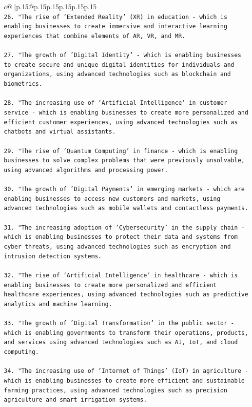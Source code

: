 \documentclass{article}
\begin{document}
{\begin{supertabular}{c@{$\;$}|p{.15\linewidth}@{}p{.15\linewidth}p{.15\linewidth}p{.15\linewidth}p{.15\linewidth}p{.15\linewidth}}
{{{\\ 
\texttt{26. "The rise of 'Extended Reality' (XR) in education {-} which is enabling businesses to create immersive and interactive learning experiences that combine elements of AR, VR, and MR.} \\
\\ 
\texttt{27. "The growth of 'Digital Identity' {-} which is enabling businesses to create secure and unique digital identities for individuals and organizations, using advanced technologies such as blockchain and biometrics.} \\
\\ 
\texttt{28. "The increasing use of 'Artificial Intelligence' in customer service {-} which is enabling businesses to create more personalized and efficient customer experiences, using advanced technologies such as chatbots and virtual assistants.} \\
\\ 
\texttt{29. "The rise of 'Quantum Computing' in finance {-} which is enabling businesses to solve complex problems that were previously unsolvable, using advanced algorithms and processing power.} \\
\\ 
\texttt{30. "The growth of 'Digital Payments' in emerging markets {-} which are enabling businesses to access new customers and markets, using advanced technologies such as mobile wallets and contactless payments.} \\
\\ 
\texttt{31. "The increasing adoption of 'Cybersecurity' in the supply chain {-} which is enabling businesses to protect their data and systems from cyber threats, using advanced technologies such as encryption and intrusion detection systems.} \\
\\ 
\texttt{32. "The rise of 'Artificial Intelligence' in healthcare {-} which is enabling businesses to create more personalized and efficient healthcare experiences, using advanced technologies such as predictive analytics and machine learning.} \\
\\ 
\texttt{33. "The growth of 'Digital Transformation' in the public sector {-} which is enabling governments to transform their operations, products, and services using advanced technologies such as AI, IoT, and cloud computing.} \\
\\ 
\texttt{34. "The increasing use of 'Internet of Things' (IoT) in agriculture {-} which is enabling businesses to create more efficient and sustainable farming practices, using advanced technologies such as precision agriculture and smart irrigation systems.} \\
}}}
\end{supertabular}}
\end{document}
